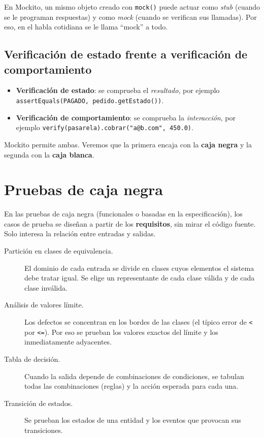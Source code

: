 \documentclass[11pt,a4paper,oneside]{report}
\newcommand{\code}[1]{\texttt{#1}}
\begin{document}
\begin{idea}
En Mockito, un mismo objeto creado con \code{mock()} puede actuar como \emph{stub} (cuando se le programan respuestas) y como \emph{mock} (cuando se verifican sus llamadas). Por eso, en el habla cotidiana se le llama ``mock'' a todo.
\end{idea}

\subsection{Verificación de estado frente a verificación de comportamiento}
\begin{itemize}
  \item \textbf{Verificación de estado}: se comprueba el \emph{resultado}, por ejemplo \code{assertEquals(PAGADO, pedido.getEstado())}.
  \item \textbf{Verificación de comportamiento}: se comprueba la \emph{interacción}, por ejemplo \code{verify(pasarela).cobrar("a@b.com", 450.0)}.
\end{itemize}
Mockito permite ambas. Veremos que la primera encaja con la \textbf{caja negra} y la segunda con la \textbf{caja blanca}.

\section{Pruebas de caja negra}
En las pruebas de caja negra (funcionales o basadas en la especificación), los casos de prueba se diseñan a partir de los \textbf{requisitos}, sin mirar el código fuente. Solo interesa la relación entre entradas y salidas.

\begin{description}
  \item[Partición en clases de equivalencia.] El dominio de cada entrada se divide en clases cuyos elementos el sistema debe tratar igual. Se elige un representante de cada clase válida y de cada clase inválida.
  \item[Análisis de valores límite.] Los defectos se concentran en los bordes de las clases (el típico error de \code{<} por \code{<=}). Por eso se prueban los valores exactos del límite y los inmediatamente adyacentes.
  \item[Tabla de decisión.] Cuando la salida depende de combinaciones de condiciones, se tabulan todas las combinaciones (reglas) y la acción esperada para cada una.
  \item[Transición de estados.] Se prueban los estados de una entidad y los eventos que provocan sus transiciones.
\end{description}
\end{document}
